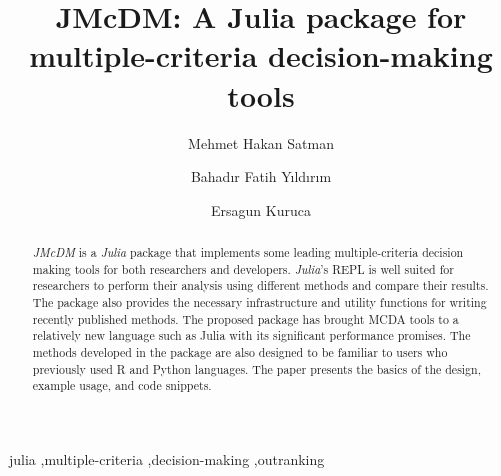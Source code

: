 \documentclass[preprint,review, 12pt, a4paper]{elsarticle}
\begin{document}
\begin{frontmatter}



\title{JMcDM: A Julia package for multiple-criteria decision-making tools}


\author[author1]{Mehmet Hakan Satman}
\author[author2]{Bahadır Fatih Yıldırım}
\author[author3]{Ersagun Kuruca}


\address[author1]{Istanbul University, Department of Econometrics, Beyazit, Istanbul, Turkey}
\address[author2]{Istanbul University, Department of Transportation and Logistics, Avcilar, Istanbul, Turkey}
\address[author3]{Istanbul Technical University, Department of Computer Engineering, Sariyer,  Istanbul, Turkey}





\begin{abstract}
\emph{JMcDM} is a \emph{Julia} package that implements some leading multiple-criteria decision making tools for both researchers and developers. \emph{Julia}'s REPL is well suited for researchers to perform their analysis using different methods and compare their results. The package also provides the necessary infrastructure and utility functions for writing recently published methods.  The proposed package has brought MCDA tools to a relatively new language such as Julia with its significant performance promises. The methods developed in the package are also designed to be familiar to users who previously used R and Python languages. The paper presents the basics of the design, example usage, and code snippets.

\end{abstract}

\begin{keyword}
julia  \sep multiple-criteria \sep decision-making \sep outranking



\end{keyword}

\end{frontmatter}
\end{document}
